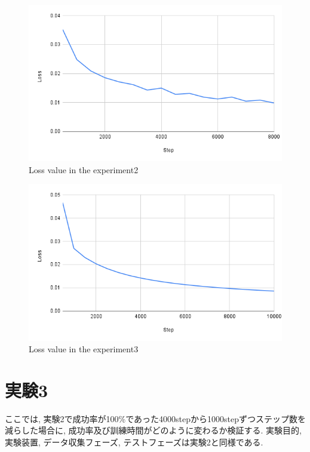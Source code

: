\begin{figure}[h]
  \centering
  \includegraphics[keepaspectratio, scale=0.31]{images/exp3_8000.png}
  \caption{Loss value in the experiment2}
  \label{Fig:exp2.2-8000}
  \end{figure}

\begin{figure}[h]
  \centering
  \includegraphics[keepaspectratio, scale=0.31]{images/exp3_10000.png}
  \caption{Loss value in the experiment3}
  \label{Fig:exp2.2-10000}
  \end{figure}

\section{実験3}
ここでは, 実験2で成功率が100\%であった4000stepから1000stepずつステップ数を減らした場合に, 成功率及び訓練時間がどのように変わるか検証する. 実験目的, 実験装置, データ収集フェーズ, テストフェーズは実験2と同様である. 

